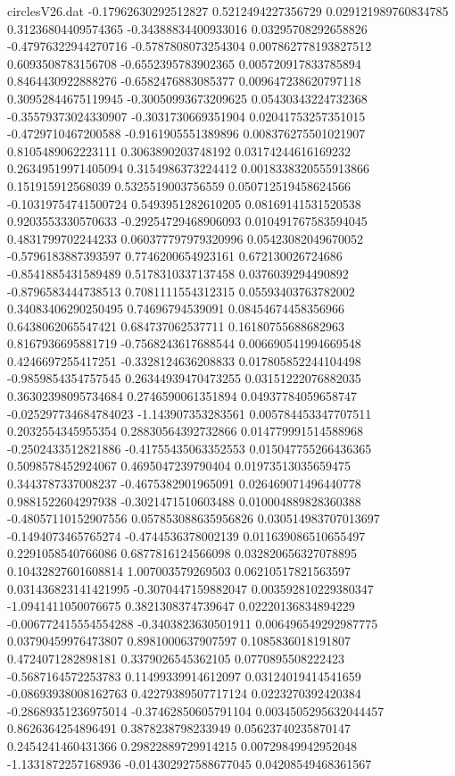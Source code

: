 \begin{filecontents}{circlesV26.dat}
-0.17962630292512827	0.5212494227356729	0.029121989760834785
0.31236804409574365	-0.34388834400933016	0.03295708292658826
-0.47976322944270716	-0.5787808073254304	0.007862778193827512
0.6093508783156708	-0.6552395783902365	0.005720917833785894
0.8464430922888276	-0.6582476883085377	0.009647238620797118
0.30952844675119945	-0.30050993673209625	0.05430343224732368
-0.35579373024330907	-0.3031730669351904	0.02041753257351015
-0.4729710467200588	-0.9161905551389896	0.008376275501021907
0.8105489062223111	0.3063890203748192	0.03174244616169232
0.26349519971405094	0.3154986373224412	0.0018338320555913866
0.151915912568039	0.5325519003756559	0.050712519458624566
-0.10319754741500724	0.5493951282610205	0.08169141531520538
0.9203553330570633	-0.29254729468906093	0.010491767583594045
0.4831799702244233	0.060377797979320996	0.05423082049670052
-0.5796183887393597	0.7746200654923161	0.672130026724686
-0.8541885431589489	0.5178310337137458	0.0376039294490892
-0.8796583444738513	0.7081111554312315	0.05593403763782002
0.34083406290250495	0.74696794539091	0.08454674458356966
0.6438062065547421	0.684737062537711	0.16180755688682963
0.8167936695881719	-0.7568243617688544	0.006690541994669548
0.4246697255417251	-0.3328124636208833	0.017805852244104498
-0.9859854354757545	0.26344939470473255	0.03151222076882035
0.36302398095734684	0.2746590061351894	0.04937784059658747
-0.025297734684784023	-1.143907353283561	0.005784453347707511
0.2032554345955354	0.28830564392732866	0.014779991514588968
-0.2502433512821886	-0.41755435063352553	0.015047755266436365
0.5098578452924067	0.4695047239790404	0.01973513035659475
0.3443787337008237	-0.4675382901965091	0.026469071496440778
0.9881522604297938	-0.3021471510603488	0.010004889828360388
-0.48057110152907556	0.057853088635956826	0.030514983707013697
-0.1494073465765274	-0.4744536378002139	0.011639086510655497
0.2291058540766086	0.6877816124566098	0.032820656327078895
0.10432827601608814	1.007003579269503	0.06210517821563597
0.031436823141421995	-0.3070447159882047	0.003592810229380347
-1.0941411050076675	0.3821308374739647	0.02220136834894229
-0.006772415554554288	-0.3403823630501911	0.006496549292987775
0.03790459976473807	0.8981000637907597	0.1085836018191807
0.4724071282898181	0.3379026545362105	0.0770895508222423
-0.5687164572253783	0.11499339914612097	0.03124019414541659
-0.08693938008162763	0.42279389507717124	0.0223270392420384
-0.28689351236975014	-0.37462850605791104	0.0034505295632044457
0.8626364254896491	0.3878238798233949	0.05623740235870147
0.2454241460431366	0.29822889729914215	0.00729849942952048
-1.1331872257168936	-0.014302927588677045	0.04208549468361567

\end{filecontents}
